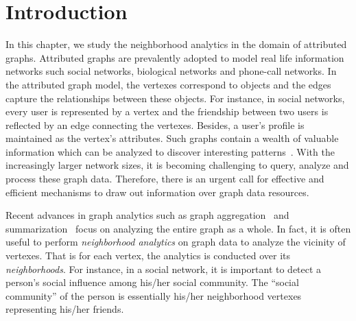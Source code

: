 \section{Introduction}

In this chapter, we study the neighborhood analytics
in the domain of attributed graphs. 
Attributed graphs are prevalently adopted to model 
real life information networks such social networks, 
biological networks and phone-call networks. 
In the attributed graph model, the vertexes correspond to objects and 
the edges capture the relationships between these objects. 
For instance, in social networks, every user is 
represented by a vertex and the friendship between two 
users is reflected by an edge connecting the vertexes. 
Besides, a user's profile is maintained as the vertex's attributes.
Such graphs contain a wealth of valuable information which can be analyzed to 
discover interesting patterns~\cite{chen2008graph,zhao2011graph,wang2014pagrol,tian2008efficient}.  
With the increasingly larger network sizes, 
it is becoming challenging to query, analyze and process 
these graph data. Therefore, there is an urgent call 
for effective and efficient mechanisms to draw out
information over graph data resources.

%

Recent advances in graph analytics such as graph aggregation~\cite{zhao2011graph,wang2014pagrol} and 
summarization~\cite{chen2008graph,tian2008efficient} focus on analyzing the entire graph as a whole. 
In fact, it is often useful to perform \emph{neighborhood
analytics} on graph data to analyze the vicinity of vertexes. 
That is for each vertex, the analytics is conducted over its \emph{neighborhoods}. 
For instance, in a social network, it is important to detect 
a person's social influence among his/her social community. 
The ``social community'' of the person is essentially his/her neighborhood vertexes representing his/her friends.


